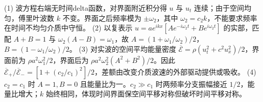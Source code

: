 (1) 波方程右端无时间delta函数，对界面附近积分得 \(u\) 与 \(u_t\) 连续；由于空间均匀，傅里叶波数 \(k\) 不变。界面之后频率模为 \(\pm\omega_2\)，其中 \(\omega_2=c_2k\)，不能要求频率在时间不均匀介质中守恒。
(2) 以复表示 \(u=a e^{ikx}[A e^{-i\omega_2t}+B e^{i\omega_2t}]\) 的实部，匹配 \(A+B=1\) 与 \(\omega_2(A-B)=\omega_1\)，故 \(A=(1+\omega_1/\omega_2)/2\)，\(B=(1-\omega_1/\omega_2)/2\)。
(3) 对实波的空间平均能量密度 \(\overline{\mathcal E}=\rho(u_t^2+c^2u_x^2)/2\)，界面前为 \(\rho a^2\omega_1^2/2\)，界面后为 \(\rho a^2\omega_2^2(A^2+B^2)/2\)。因此 \(\overline{\mathcal E}_+/\overline{\mathcal E}_-=[1+(c_2/c_1)^2]/2\)，差额由改变介质波速的外部驱动提供或吸收。
(4) \(c_2=c_1\) 时 \(A=1,B=0\) 且能量比为一。\(c_2\gg c_1\) 时两频率分支振幅接近 \(1/2\)，能量比增大；\(k\) 始终相同，体现时间界面保空间平移对称但破坏时间平移对称。
